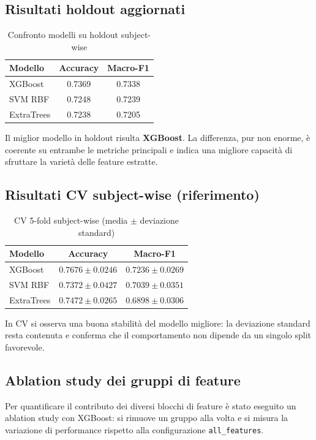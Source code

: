 \documentclass[a4paper,12pt]{article}
\begin{document}
\subsection{Risultati holdout aggiornati}
\begin{table}[H]
\centering
\caption{Confronto modelli su holdout subject-wise}
\begin{tabular}{lcc}
\toprule
Modello & Accuracy & Macro-F1 \\
\midrule
XGBoost & 0.7369 & 0.7338 \\
SVM RBF & 0.7248 & 0.7239 \\
ExtraTrees & 0.7238 & 0.7205 \\
\bottomrule
\end{tabular}
\end{table}

Il miglior modello in holdout risulta \textbf{XGBoost}.
La differenza, pur non enorme, è coerente su entrambe le metriche principali e indica una migliore capacità di sfruttare la varietà delle feature estratte.

\subsection{Risultati CV subject-wise (riferimento)}
\begin{table}[H]
\centering
\caption{CV 5-fold subject-wise (media $\pm$ deviazione standard)}
\begin{tabular}{lcc}
\toprule
Modello & Accuracy & Macro-F1 \\
\midrule
XGBoost & $0.7676 \pm 0.0246$ & $0.7236 \pm 0.0269$ \\
SVM RBF & $0.7372 \pm 0.0427$ & $0.7039 \pm 0.0351$ \\
ExtraTrees & $0.7472 \pm 0.0265$ & $0.6898 \pm 0.0306$ \\
\bottomrule
\end{tabular}
\end{table}

In CV si osserva una buona stabilità del modello migliore: la deviazione standard resta contenuta e conferma che il comportamento non dipende da un singolo split favorevole.


\subsection{Ablation study dei gruppi di feature}
Per quantificare il contributo dei diversi blocchi di feature è stato eseguito un ablation study con XGBoost: si rimuove un gruppo alla volta e si misura la variazione di performance rispetto alla configurazione \texttt{all\_features}.
\end{document}
